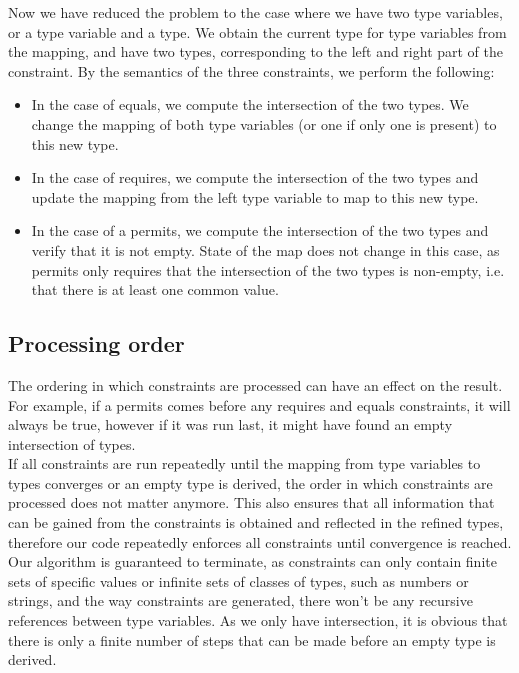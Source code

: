 \documentclass[a4paper]{article}
\begin{document}
Now we have reduced the problem to the case where we have two type variables,
or a type variable and a type.
We obtain the current type for type variables from the mapping,
and have two types, corresponding to the left and right part of the constraint.
By the semantics of the three constraints, we perform the following:
\begin{itemize}
\item
In the case of equals, we compute the intersection of the two
types.
We change the mapping of both type variables (or one if only one is present)
to this new type.
\item
In the case of requires, we compute the intersection of the two types
and update the mapping from the left type variable to map to this new type.
\item
In the case of a permits, we compute the intersection of the two types and verify
that it is not empty.
State of the map does not change in this case, as permits only requires that the
intersection of the two types is non-empty, i.e. that there is at least one common value.
\end{itemize}

\subsection{Processing order}

The ordering in which constraints are processed can have an effect on the result.
For example, if a permits comes before any requires and equals constraints,
it will always be true, however if it was run last, it might have found
an empty intersection of types.\\

If all constraints are run repeatedly until the mapping from type variables
to types converges or an empty type is derived, the order in which constraints are
processed does not matter anymore.
This also ensures that all information that can be gained from the constraints
is obtained and reflected in the refined types, therefore our code repeatedly
enforces all constraints until convergence is reached.\\

Our algorithm is guaranteed to terminate, as constraints can only contain finite sets
of specific values or infinite sets of classes of types, such as numbers or strings,
and the way constraints are generated, there won't be any recursive references between type
variables.
As we only have intersection, it is obvious that there is only a finite number of steps
that can be made before an empty type is derived.
\end{document}
